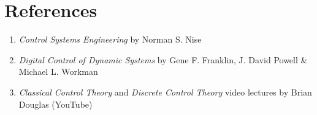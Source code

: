 \documentclass{article}
\begin{document}
\vspace{1em}

\section{References}
\begin{enumerate}
    \item \textit{Control Systems Engineering} by Norman S. Nise
    \item \textit{Digital Control of Dynamic Systems} by Gene F. Franklin, J. David Powell \& Michael L. Workman
    \item \textit{Classical Control Theory} and \textit{Discrete Control Theory} video lectures by Brian Douglas (YouTube)
\end{enumerate}
\end{document}
